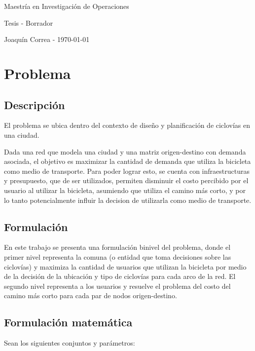 \documentclass{article}
\begin{document}
  \begin{center}
    {\sc \large Maestría en Investigación de Operaciones}
    
    {\sc \large Tesis - Borrador}
    \linebreak

    {\rm Joaquín Correa - \today}
  \end{center}

  \section*{Problema}

  \subsection*{Descripción}

  El problema se ubica dentro del contexto de diseño y planificación de ciclovías en una ciudad.

  Dada una red que modela una ciudad y una matriz origen-destino con demanda asociada, el objetivo es maximizar la cantidad de demanda que utiliza la bicicleta como medio de transporte. Para poder lograr esto, se cuenta con infraestructuras y presupuesto, que de ser utilizados, permiten disminuir el costo percibido por el usuario al utilizar la bicicleta, asumiendo que utiliza el camino más corto, y por lo tanto potencialmente influir la decision de utilizarla como medio de transporte.

  \subsection*{Formulación}

  En este trabajo se presenta una formulación binivel del problema, donde el primer nivel representa la comuna (o entidad que toma decisiones sobre las ciclovías) y maximiza la cantidad de usuarios que utilizan la bicicleta por medio de la decisión de la ubicación y tipo de ciclovías para cada arco de la red. El segundo nivel representa a los usuarios y resuelve el problema del costo del camino más corto para cada par de nodos origen-destino.

  \subsection*{Formulación matemática}

  Sean los siguientes conjuntos y parámetros:
\end{document}
